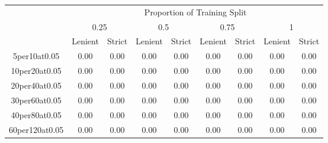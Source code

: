 \documentclass[12pt]{article}
\begin{document}
\begin{table}[]
    \begin{tabular}{|c|cc|cc|cc|cc|}
        \hline
                        & \multicolumn{8}{c|}{Proportion of Training Split}                                                                                                                                                                                          \\
                        & \multicolumn{2}{c}{0.25}                                 & \multicolumn{2}{c}{0.5}                                  & \multicolumn{2}{c}{0.75}                                 & \multicolumn{2}{c|}{1}                                    \\
                        & \multicolumn{1}{c}{Lenient} & \multicolumn{1}{c}{Strict} & \multicolumn{1}{c}{Lenient} & \multicolumn{1}{c}{Strict} & \multicolumn{1}{c}{Lenient} & \multicolumn{1}{c}{Strict} & \multicolumn{1}{c}{Lenient} & \multicolumn{1}{c|}{Strict} \\ \hline
        5per10at0.05    & 0.00                        & 0.00                       & 0.00                        & 0.00                       & 0.00                        & 0.00                       & 0.00                        & 0.00                       \\
        10per20at0.05   & 0.00                        & 0.00                       & 0.00                        & 0.00                       & 0.00                        & 0.00                       & 0.00                        & 0.00                       \\
        20per40at0.05   & 0.00                        & 0.00                       & 0.00                        & 0.00                       & 0.00                        & 0.00                       & 0.00                        & 0.00                       \\
        30per60at0.05   & 0.00                        & 0.00                       & 0.00                        & 0.00                       & 0.00                        & 0.00                       & 0.00                        & 0.00                       \\
        40per80at0.05   & 0.00                        & 0.00                       & 0.00                        & 0.00                       & 0.00                        & 0.00                       & 0.00                        & 0.00                       \\
        60per120at0.05  & 0.00                        & 0.00                       & 0.00                        & 0.00                       & 0.00                        & 0.00                       & 0.00                        & 0.00                       \\

\end{tabular}
\end{table}
\end{document}
